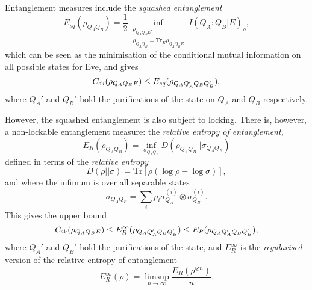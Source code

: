 \documentclass[10pt, a4paper]{article}
\numberwithin{equation}{section} %
\theoremstyle{definition}
\theoremstyle{plain}
\newcommand{\?}{\mathrel{?}} %
\newcommand{\Tr}{\mathrm{Tr}} %
\newcommand{\sk}{\rm sk}
\begin{document}
      Entanglement measures include the \emph{squashed entanglement}
      \begin{equation}
        E_{sq}(\rho_{Q_A Q_B}) = \frac{1}{2} \inf_{\substack{\rho_{Q_A Q_BE} : \\ \rho_{Q_A Q_B} = \Tr_E \rho_{Q_A Q_BE}}} I(Q_A:Q_B|E)_{\rho},
      \end{equation}
      which can be seen as the minimisation of the conditional mutual information on all possible states for Eve, and gives
      \begin{equation}
        C_{\sk}(\rho_{Q_A Q_B E}) \leq E_{sq}(\rho_{Q_A Q_A' Q_B Q_B'}),
      \end{equation}
      where \(Q_A'\) and \(Q_B'\) hold the purifications of the state on \(Q_A\) and \(Q_B\) respectively.

      However, the squashed entanglement is also subject to locking. There is, however, a non-lockable entanglement measure: the \emph{relative entropy of entanglement},  
      \begin{equation}
        E_R\left({\rho_{Q_AQ_B}}\right) = \inf_{\sigma_{Q_AQ_B}} D(\rho_{Q_AQ_B}||\sigma_{Q_AQ_B})
      \end{equation}
      defined in terms of the \emph{relative entropy}
      \begin{equation}
        D(\rho||\sigma) = \Tr\left[ \rho (\log \rho - \log \sigma) \right],
      \end{equation}
      and where the infimum is over all separable states
      \begin{equation}
        \sigma_{Q_AQ_B} = \sum_i p_i \sigma_{Q_A}^{(i)} \otimes \sigma_{Q_B}^{(i)}.
      \end{equation}
      This gives the upper bound
      \begin{equation}
        C_{\sk}(\rho_{Q_A Q_B E}) \leq E_{R}^{\infty}(\rho_{Q_A Q_A' Q_B Q_B'}) \leq E_{R}(\rho_{Q_A Q_A' Q_B Q_B'}),
      \end{equation}
      where \(Q_A'\) and \(Q_B'\) hold the purifications of the state, and \(E_{R}^{\infty}\) is the \emph{regularised} version of the relative entropy of entanglement
      \begin{equation}
        E_{R}^{\infty}(\rho) = \limsup_{n\to\infty} \frac{E_R(\rho^{\otimes n})}{n}.
      \end{equation}
\end{document}
